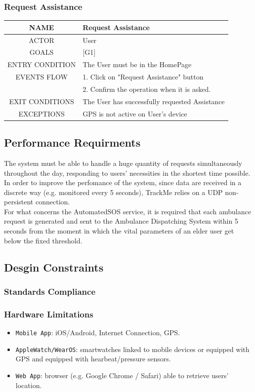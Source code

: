 \documentclass[12pt,a4paper]{article}
\begin{document}
	\subsubsection{Request Assistance}
	\begin{center}
		\begin{tabular}{| c | l |}
			\hline
			NAME & Request Assistance \\
			\hline
			ACTOR & User \\
			\hline
			GOALS & [G1] \\
			\hline
			ENTRY CONDITION & The User must be in the HomePage \\ \hline
			EVENTS FLOW  &
			1. Click on "Request Assistance" button\\
			&2. Confirm the operation when it is asked.\\
			\hline
			EXIT CONDITIONS  & The User has successfully requested Assistance \\ \hline
			EXCEPTIONS & 
			GPS is not active on User's device\\
			\hline
		\end{tabular}
	\end{center}
	
	
	\subsection{Performance Requirments}
	The system must be able to handle a huge quantity of requests simultaneously throughout the day, responding to users' necessities in the shortest time possible. In order to improve the perfomance of the system, since data are received in a discrete way (e.g. monitored every 5 seconds), TrackMe relies on a UDP non-persistent connection.\\
	For what concerns the AutomatedSOS service, it is required that each ambulance request is generated and sent to the Ambulance Dispatching System within 5 seconds from the moment in which the vital parameters of an elder user get below the fixed threshold.
	
	\subsection{Desgin Constraints}
	\subsubsection{Standards Compliance}
	\subsubsection{Hardware Limitations}
		\begin{itemize}
			\item \texttt{Mobile App}: iOS/Android, Internet Connection, GPS.
			\item \texttt{AppleWatch/WearOS}: smartwatches linked to mobile devices or equipped with GPS and equipped with hearbeat/pressure sensors.
			\item \texttt{Web App}: browser (e.g. Google Chrome / Safari) able to retrieve users' location.
		\end{itemize}
\end{document}
